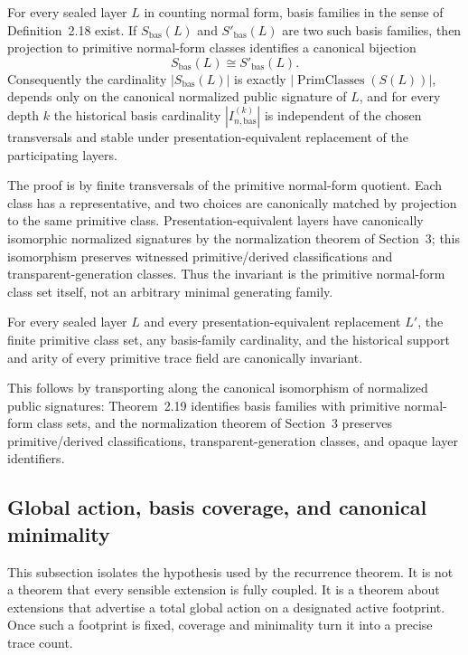 \documentclass{lmcs}
\begin{document}
\begin{thm}
For every sealed layer \(L\) in counting normal form, basis families in the sense of
Definition~2.18 exist.  If \(S_{\mathrm{bas}}(L)\) and \(S'_{\mathrm{bas}}(L)\) are two such basis
families, then projection to primitive normal-form classes identifies a canonical bijection
\[
  S_{\mathrm{bas}}(L) \cong S'_{\mathrm{bas}}(L).
\]
Consequently the cardinality \(|S_{\mathrm{bas}}(L)|\) is exactly
\(|\operatorname{PrimClasses}(S(L))|\), depends only on the canonical normalized public
signature of \(L\), and for every depth \(k\) the historical basis cardinality
\(|I_{n,\mathrm{bas}}^{(k)}|\) is independent of the chosen transversals and stable under
presentation-equivalent replacement of the participating layers.
\end{thm}

The proof is by finite transversals of the primitive normal-form quotient.  Each class has a
representative, and two choices are canonically matched by projection to the same primitive
class.  Presentation-equivalent layers have canonically isomorphic normalized signatures by
the normalization theorem of Section~3; this isomorphism preserves witnessed primitive/derived
classifications and transparent-generation classes.  Thus the invariant is the primitive
normal-form class set itself, not an arbitrary minimal generating family.

\begin{lem}
For every sealed layer \(L\) and every presentation-equivalent replacement \(L'\), the finite
primitive class set, any basis-family cardinality, and the historical support and arity of every
primitive trace field are canonically invariant.
\end{lem}
This follows by transporting along the canonical isomorphism of normalized public
signatures: Theorem~2.19 identifies basis families with primitive normal-form class sets, and
the normalization theorem of Section~3 preserves primitive/derived classifications,
transparent-generation classes, and opaque layer identifiers.

\subsection{Global action, basis coverage, and canonical minimality}

This subsection isolates the hypothesis used by the recurrence theorem.  It is not a theorem
that every sensible extension is fully coupled.  It is a theorem about extensions that advertise
a total global action on a designated active footprint.  Once such a footprint is fixed,
coverage and minimality turn it into a precise trace count.
\end{document}
